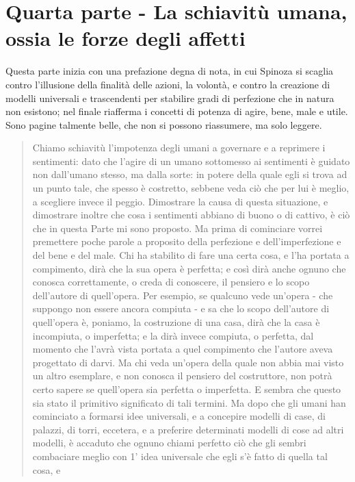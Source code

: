 \section[La schiavitù umana]{Quarta parte - La schiavitù umana, \\ossia le forze degli affetti}
\bigskip
Questa parte inizia con una prefazione degna di nota, in cui Spinoza si scaglia contro l'illusione della finalità delle azioni, la volontà, e contro la creazione di modelli universali e trascendenti per stabilire gradi di perfezione che in natura non esistono; nel finale riafferma i concetti di potenza di agire, bene, male e utile. Sono pagine talmente belle, che non si possono riassumere, ma solo leggere.

\begin{quotation}
	\small Chiamo schiavitù l’impotenza degli umani a governare e a reprimere i sentimenti: dato che l’agire di un umano sottomesso ai sentimenti è guidato non dall’umano
	stesso, ma dalla sorte: in potere della quale egli si trova ad un punto tale, che spesso è costretto, sebbene veda ciò che per lui è meglio, a scegliere invece il peggio. Dimostrare la
	causa di questa situazione, e dimostrare inoltre che cosa i sentimenti abbiano di buono o di
	cattivo, è ciò che in questa Parte mi sono proposto. Ma prima di cominciare vorrei premettere poche parole a proposito della perfezione e dell’imperfezione e del bene e del male.
	Chi ha stabilito di fare una certa cosa, e l’ha portata a compimento, dirà che la sua opera
	è perfetta; e così dirà anche ognuno che conosca correttamente, o creda di conoscere, il
	pensiero e lo scopo dell’autore di quell’opera. Per esempio, se qualcuno vede un’opera - che
	suppongo non essere ancora compiuta - e sa che lo scopo dell’autore di quell’opera è, poniamo, la costruzione di una casa, dirà che la casa è incompiuta, o imperfetta; e la dirà invece compiuta, o perfetta, dal momento che l’avrà vista portata a quel compimento che
	l’autore aveva progettato di darvi. Ma chi veda un’opera della quale non abbia mai visto un
	altro esemplare, e non conosca il pensiero del costruttore, non potrà certo sapere se
	quell’opera sia perfetta o imperfetta. E sembra che questo sia stato il primitivo significato
	di tali termini. Ma dopo che gli umani han cominciato a formarsi idee universali, e a concepire modelli di case, di palazzi, di torri, eccetera, e a preferire determinati modelli di cose ad altri modelli, è accaduto che ognuno chiami perfetto ciò
	che gli sembri combaciare meglio con 1’ idea universale che egli s’è fatto di quella tal cosa, e

\end{quotation}
